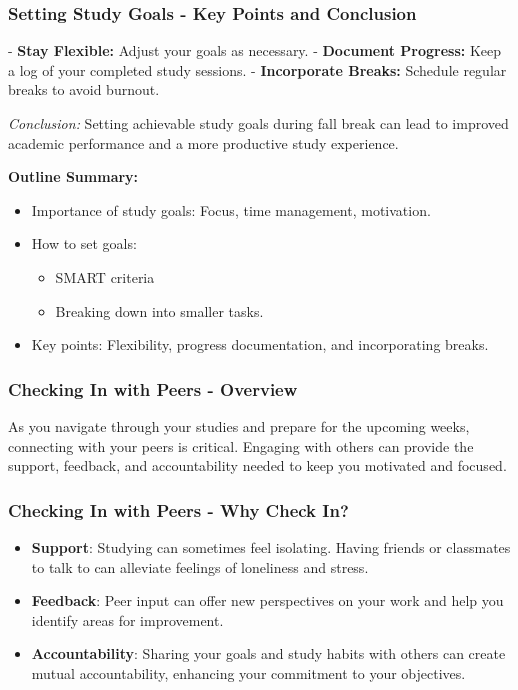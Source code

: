 \documentclass[aspectratio=169]{beamer}
\begin{document}
\begin{frame}[fragile]
    \frametitle{Setting Study Goals - Key Points and Conclusion}
    
    - \textbf{Stay Flexible:} Adjust your goals as necessary.
    - \textbf{Document Progress:} Keep a log of your completed study sessions.
    - \textbf{Incorporate Breaks:} Schedule regular breaks to avoid burnout.
    
    \textit{Conclusion:} Setting achievable study goals during fall break can lead to improved academic performance and a more productive study experience. 

    \textbf{Outline Summary:}
    \begin{itemize}
        \item Importance of study goals: Focus, time management, motivation.
        \item How to set goals: 
            \begin{itemize}
                \item SMART criteria 
                \item Breaking down into smaller tasks.
            \end{itemize}
        \item Key points: Flexibility, progress documentation, and incorporating breaks.
    \end{itemize}
\end{frame}

\begin{frame}[fragile]
    \frametitle{Checking In with Peers - Overview}
    As you navigate through your studies and prepare for the upcoming weeks, connecting with your peers is critical. Engaging with others can provide the support, feedback, and accountability needed to keep you motivated and focused.
\end{frame}

\begin{frame}[fragile]
    \frametitle{Checking In with Peers - Why Check In?}
    \begin{itemize}
        \item \textbf{Support}: Studying can sometimes feel isolating. Having friends or classmates to talk to can alleviate feelings of loneliness and stress.
        \item \textbf{Feedback}: Peer input can offer new perspectives on your work and help you identify areas for improvement.
        \item \textbf{Accountability}: Sharing your goals and study habits with others can create mutual accountability, enhancing your commitment to your objectives.
    \end{itemize}
\end{frame}
\end{document}
